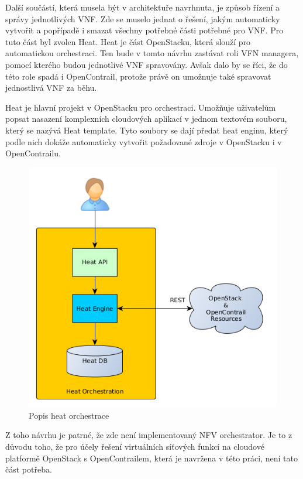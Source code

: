 Další součástí, která musela být v architektuře navrhnuta, je způsob řízení a správy jednotlivých VNF. Zde se muselo jednat o řešení, jakým automaticky vytvořit a popřípadě i smazat všechny potřebné části potřebné pro VNF. Pro tuto část byl zvolen Heat. Heat je část OpenStacku, která slouží pro automatickou orchestraci. Ten bude v tomto návrhu zastávat roli VFN managera, pomocí kterého budou jednotlivé VNF spravovány. Avšak dalo by se říci, že do této role spadá i OpenContrail, protože právě on umožnuje také spravovat jednostlivá VNF za běhu.  

Heat je hlavní projekt v OpenStacku pro orchestraci. Umožňuje uživatelům popsat nasazení komplexních cloudových aplikací v jednom textovém souboru, který se nazývá Heat template. Tyto soubory se dají předat heat enginu, který podle nich dokáže automaticky vytvořit požadované zdroje v OpenStacku i v OpenContrailu. 

\begin{figure}[h]
\begin{centering}
\includegraphics[scale=0.41]{images/heat_engine}
\par\end{centering}
\caption{Popis heat orchestrace\label{fig:heat_engine}}
\end{figure}

Z toho návrhu je patrné, že zde není implementovaný NFV orchestrator. Je to z důvodu toho, že pro účely řešení virtuálních síťových funkcí na cloudové platformě OpenStack s OpenContrailem, která je navržena v této práci, není tato část potřeba. 

